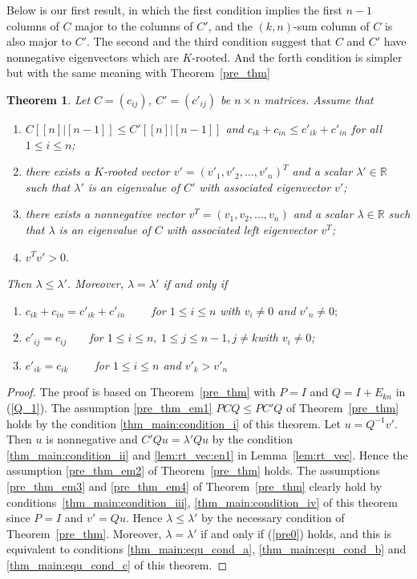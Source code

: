 \documentclass[12pt, a4paper]{article}
\theoremstyle{plain}
\newtheorem{thm}{Theorem}[section]
\theoremstyle{definition}
\begin{document}
Below is our first result, in which the first condition implies the first $n-1$ columns of $C$ major to
 the columns of $C'$, and the $(k,n)$-sum column of $C$ is also major to $C'$. The second and the third condition
 suggest that $C$ and $C'$ have nonnegative eigenvectors which are $K$-rooted. And the forth condition is simpler
  but with the same meaning with Theorem~\ref{pre_thm}
\begin{thm}\label{thm_main}
    Let $C=(c_{ij})$, $C'=(c'_{ij})$ be  $n\times n$ matrices.
Assume that
\begin{enumerate}[label=(\roman*)]
\item \label{thm_main:condition_i} $C[[n]|[n-1]]\leq C'[[n]|[n-1]]$ and $c_{ik}+c_{in}\leq c'_{ik}+c'_{in}$ for all $1\leq i\leq n$;
\item \label{thm_main:condition_ii} there exists a $K$-rooted vector $v'=(v'_1, v'_2, \ldots, v'_n)^T$ and a scalar $\lambda'\in \mathbb{R}$
such that $\lambda'$ is an eigenvalue of $C'$ with associated eigenvector $v'$;
\item \label{thm_main:condition_iii}there exists a nonnegative vector $v^T=(v_1, v_2, \ldots, v_n)$ and a scalar $\lambda\in \mathbb{R}$ such that $\lambda$ is an eigenvalue of $C$ with associated left eigenvector $v^T$;
\item \label{thm_main:condition_iv}$v^Tv'>0.$
\end{enumerate}
 Then $\lambda\leq \lambda'$.
Moreover, $\lambda=\lambda'$
if and only if
\begin{enumerate}[label=(\alph*)]
    \item \label{thm_main:equ_cond_a} $c_{ik}+c_{in}=c'_{ik}+c'_{in} \qquad$  for $1\leq i\leq n$ with $v_i\not=0$ and $v'_n\not=0;$
    \item \label{thm_main:equ_cond_b} $c'_{ij}=c_{ij}\qquad $for $1\leq i\leq n,~1\leq j\leq n-1, j \neq k $with $v_i\ne 0 $;
    \item \label{thm_main:equ_cond_c} $c'_{ik}=c_{ik} \qquad $  for $1\leq i \leq n$ and $ v'_{k}>v'_n$
\end{enumerate} %
\end{thm}
%


\begin{proof}
    The proof is based on Theorem~\ref{pre_thm} with $P = I$ and $Q = I + E_{kn}$ in (\ref{Q_1}).
    The assumption \ref{pre_thm_em1} $PCQ\leq PC'Q$ of Theorem~\ref{pre_thm} holds by the condition \ref{thm_main:condition_i} of this theorem.
    Let $u = Q^{-1}v'$. Then $u$ is nonnegative and $C'Qu = \lambda' Qu$ by the condition \ref{thm_main:condition_ii} and \ref{lem:rt_vec:en1} in
     Lemma~\ref{lem:rt_vec}. Hence the assumption \ref{pre_thm_em2} of Theorem~\ref{pre_thm} holds. The assumptions \ref{pre_thm_em3} and \ref{pre_thm_em4}
      of Theorem~\ref{pre_thm} clearly hold by conditions~\ref{thm_main:condition_iii}, \ref{thm_main:condition_iv} of this theorem since $P = I$ and
       $v'= Qu$. Hence $\lambda \leq \lambda' $ by the necessary condition of Theorem~\ref{pre_thm}. Moreover,
        $\lambda = \lambda'$ if and only if (\ref{pre0}) holds, and this is equivalent to
         conditions \ref{thm_main:equ_cond_a}, \ref{thm_main:equ_cond_b} and \ref{thm_main:equ_cond_c} of this theorem.
\end{proof}
\end{document}
